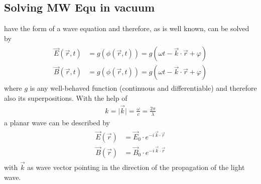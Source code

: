 \subsection{Solving MW Equ in vacuum}
% 
 have the form of a wave equation and therefore, as is well known, can be solved by
% 
% 
\begin{align}
\begin{split} \label{eq::dgl_solution}
  \vec{E}( \vec{r}, t ) &= g(\phi( \vec{r}, t )) = g( \omega t - \vec{k} \cdot \vec{r} + \varphi)\\
  \vec{B}( \vec{r}, t ) &= g(\phi( \vec{r}, t )) = g( \omega t - \vec{k} \cdot \vec{r} + \varphi )
\end{split}
\end{align}
% 
where $g$ is any well-behaved function (continuous and differentiable) and therefore also its superpositions.
% 
With the help of
% 
\begin{align}
k = \mathopen| \vec{k} \mathclose| = \frac{\omega}{c} =  \frac{2 \pi}{\lambda}
\end{align}
% 
a planar wave can be described by
% 
\begin{align}
\begin{split} \label{eq::plane_wave}
\vec{E}(\vec{r}) &= \vec{E}_0 \cdot e^{ -i \, \vec{k} \cdot \vec{r} }\\
 \vec{B}(\vec{r}) &= \vec{B}_0 \cdot e^{ -i \, \vec{k} \cdot \vec{r} }
\end{split}
\end{align}
% 
with $\vec{k}$ as wave vector pointing in the direction of the propagation of the light wave.
% 
% 
